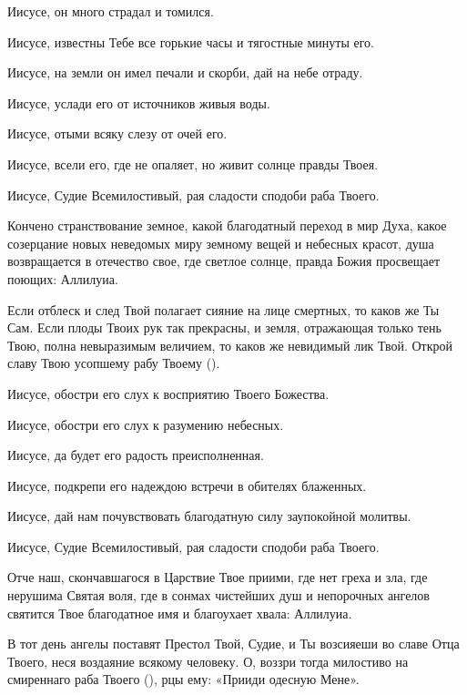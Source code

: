 \begin{mymulticols}
Иисусе, он много страдал и томился. 

Иисусе, известны Тебе все горькие часы и тягостные минуты его. 

Иисусе, на земли он имел печали и скорби, дай на небе отраду. 

Иисусе, услади его от источников живыя воды. 

Иисусе, отыми всяку слезу от очей его. 

Иисусе, всели его, где не опаляет, но живит солнце правды Твоея. 

Иисусе, Судие Всемилостивый, рая сладости сподоби раба Твоего.


Кончено странствование земное, какой благодатный переход в мир Духа, какое созерцание новых неведомых миру земному вещей и небесных красот, душа возвращается в отечество свое, где светлое солнце, правда Божия просвещает поющих: Аллилуиа.


Если отблеск и след Твой полагает сияние на лице смертных, то каков же Ты Сам. Если плоды Твоих рук так прекрасны, и земля, отражающая только тень Твою, полна невыразимым величием, то каков же невидимый лик Твой. Открой славу Твою усопшему рабу Твоему (). 

Иисусе, обостри его слух к восприятию Твоего Божества. 

Иисусе, обостри его слух к разумению небесных. 

Иисусе, да будет его радость преисполненная. 

Иисусе, подкрепи его надеждою встречи в обителях блаженных. 

Иисусе, дай нам почувствовать благодатную силу заупокойной молитвы. 

Иисусе, Судие Всемилостивый, рая сладости сподоби раба Твоего.


Отче наш, скончавшагося в Царствие Твое приими, где нет греха и зла, где нерушима Святая воля, где в сонмах чистейших душ и непорочных ангелов святится Твое благодатное имя и благоухает хвала: Аллилуиа.


В тот день ангелы поставят Престол Твой, Судие, и Ты возсияеши во славе Отца Твоего, неся воздаяние всякому человеку. О, воззри тогда милостиво на смиреннаго раба Твоего (), рцы ему: «Прииди одесную Мене». 


\end{mymulticols}
